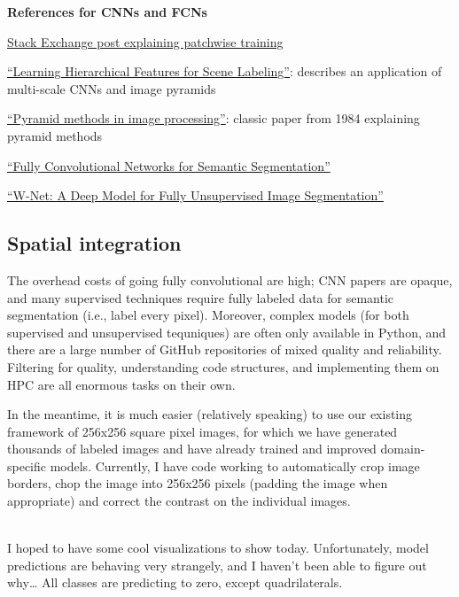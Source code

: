 \documentclass[]{book}
\begin{document}
\textbf{References for CNNs and FCNs}

\href{https://stats.stackexchange.com/questions/266075/patch-wise-training-and-fully-convolutional-training-in-fully-convolutional-neur}{Stack Exchange post explaining patchwise training}

\href{https://ieeexplore.ieee.org/abstract/document/6338939}{``Learning Hierarchical Features for Scene Labeling''}: describes an application of multi-scale CNNs and image pyramids

\href{http://citeseerx.ist.psu.edu/viewdoc/summary?doi=10.1.1.56.8646}{``Pyramid methods in image processing''}: classic paper from 1984 explaining pyramid methods

\href{https://people.eecs.berkeley.edu/~jonlong/long_shelhamer_fcn.pdf}{``Fully Convolutional Networks for Semantic Segmentation''}

\href{https://arxiv.org/pdf/1711.08506.pdf}{``W-Net: A Deep Model for Fully Unsupervised Image Segmentation''}

\hypertarget{spatial-integration}{%
\subsection{Spatial integration}\label{spatial-integration}}

The overhead costs of going fully convolutional are high; CNN papers are opaque, and many supervised techniques require fully labeled data for semantic segmentation (i.e., label every pixel). Moreover, complex models (for both supervised and unsupervised tequniques) are often only available in Python, and there are a large number of GitHub repositories of mixed quality and reliability. Filtering for quality, understanding code structures, and implementing them on HPC are all enormous tasks on their own.

In the meantime, it is much easier (relatively speaking) to use our existing framework of 256x256 square pixel images, for which we have generated thousands of labeled images and have already trained and improved domain-specific models. Currently, I have code working to automatically crop image borders, chop the image into 256x256 pixels (padding the image when appropriate) and correct the contrast on the individual images.

\\

I hoped to have some cool visualizations to show today. Unfortunately, model predictions are behaving very strangely, and I haven't been able to figure out why\ldots{} All classes are predicting to zero, except quadrilaterals.
\end{document}
